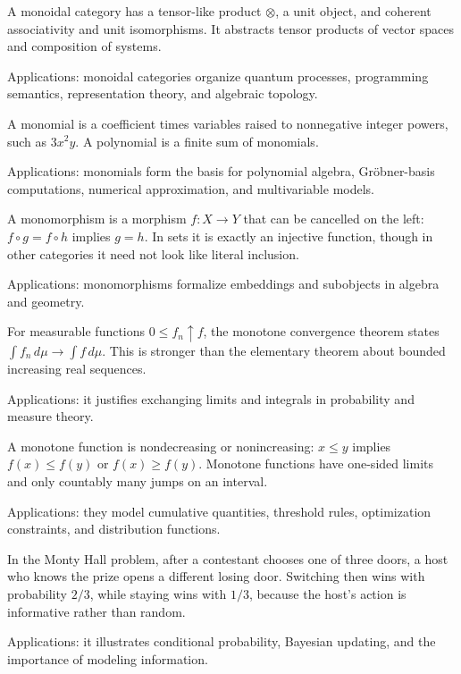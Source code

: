 A monoidal category has a tensor-like product $\otimes$, a unit object, and coherent associativity and unit isomorphisms. It abstracts tensor products of vector spaces and composition of systems. \par\noindent Applications: monoidal categories organize quantum processes, programming semantics, representation theory, and algebraic topology.

A monomial is a coefficient times variables raised to nonnegative integer powers, such as $3x^2y$. A polynomial is a finite sum of monomials. \par\noindent Applications: monomials form the basis for polynomial algebra, Gröbner-basis computations, numerical approximation, and multivariable models.

A monomorphism is a morphism $f:X\to Y$ that can be cancelled on the left: $f\circ g=f\circ h$ implies $g=h$. In sets it is exactly an injective function, though in other categories it need not look like literal inclusion. \par\noindent Applications: monomorphisms formalize embeddings and subobjects in algebra and geometry.

For measurable functions $0\leq f_n\uparrow f$, the monotone convergence theorem states $\int f_n\,d\mu\to\int f\,d\mu$. This is stronger than the elementary theorem about bounded increasing real sequences. \par\noindent Applications: it justifies exchanging limits and integrals in probability and measure theory.

A monotone function is nondecreasing or nonincreasing: $x\leq y$ implies $f(x)\leq f(y)$ or $f(x)\geq f(y)$. Monotone functions have one-sided limits and only countably many jumps on an interval. \par\noindent Applications: they model cumulative quantities, threshold rules, optimization constraints, and distribution functions.

In the Monty Hall problem, after a contestant chooses one of three doors, a host who knows the prize opens a different losing door. Switching then wins with probability $2/3$, while staying wins with $1/3$, because the host's action is informative rather than random. \par\noindent Applications: it illustrates conditional probability, Bayesian updating, and the importance of modeling information.


